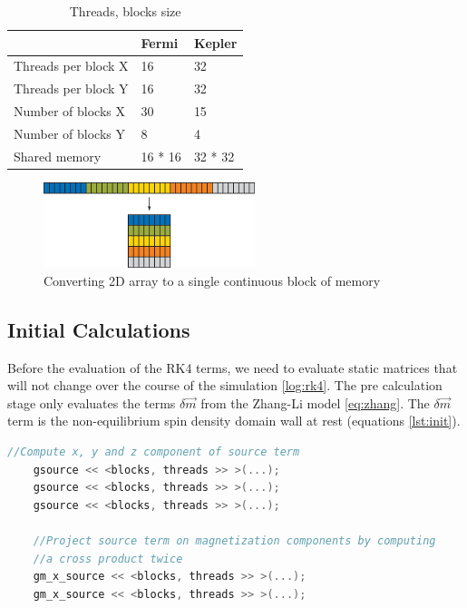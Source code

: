 \begin{table}[h]
\centering
\begin{tabular}{| l | l | l |}
\hline
 & Fermi & Kepler \\
\hline
Threads per block X  & 16 & 32 \\
\hline
Threads per block Y  & 16 & 32 \\
\hline
Number of blocks X & 30 & 15 \\
\hline
Number of blocks Y & 8 & 4 \\
\hline
Shared memory & 16 * 16 & 32 * 32 \\
\hline
\end{tabular}
\caption{Threads, blocks size}
\label{tab:threads}
\end{table}


\begin{figure}[htbp]
	\centering
		\includegraphics[width=0.55\textwidth]{Figures/flaten.png}
		\smallskip
	\caption[2D Flatten array]{Converting 2D array to a single continuous block of memory}
	\label{fig:flaten}
\end{figure}


\subsection{Initial Calculations}

Before the evaluation of the RK4 terms, we need to evaluate static matrices that will not change over the course of the simulation \ref{log:rk4}. The pre calculation stage only evaluates the terms $ \delta \vec{m}$ from the Zhang-Li model \ref{eq:zhang}. The  $ \delta \vec{m}$  term is the non-equilibrium spin density domain wall at rest \cite{claudio} (equations \ref{lst:init}).

\begin{lstlisting}[language=C++, label={lst:init}, caption={Initial calculations}]
	//Compute x, y and z component of source term
    gsource << <blocks, threads >> >(...);
    gsource << <blocks, threads >> >(...);
    gsource << <blocks, threads >> >(...);

    //Project source term on magnetization components by computing
    //a cross product twice
    gm_x_source << <blocks, threads >> >(...);
    gm_x_source << <blocks, threads >> >(...);
\end{lstlisting}

